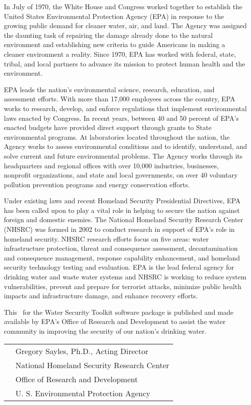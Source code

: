 In July of 1970, the White House and Congress worked together to establish 
the United States Environmental Protection Agency (EPA) in response to the 
growing public demand for cleaner water, air, and land. The Agency was assigned 
the daunting task of repairing the damage already done to the natural 
environment and establishing new criteria to guide Americans in making a cleaner 
environment a reality. Since 1970, EPA has worked with federal, state, tribal, 
and local partners to advance its mission to protect human health and the 
environment.

EPA leads the nation's environmental science, research, education, and assessment 
efforts. With more than 17,000 employees across the country, EPA works to 
research, develop, and enforce regulations that implement environmental laws 
enacted by Congress. In recent years, between 40 and 50 percent of EPA's 
enacted budgets have provided direct support through grants to State 
environmental programs. At laboratories located throughout the nation, the 
Agency works to assess environmental conditions and to identify, understand, and 
solve current and future environmental problems. The Agency works through its 
headquarters and regional offices with over 10,000 industries, businesses, 
nonprofit organizations, and state and local governments, on over 40 
voluntary pollution prevention programs and energy conservation efforts. 

Under existing laws and recent Homeland Security Presidential Directives, EPA 
has been called upon to play a vital role in helping to secure the nation 
against foreign and domestic enemies. The National Homeland Security Research 
Center (NHSRC) was formed in 2002 to conduct research in support of EPA's role 
in homeland security. NHSRC research efforts focus on five areas: water 
infrastructure protection, threat and consequence assessment, decontamination 
and consequence management, response capability enhancement, and homeland 
security technology testing and evaluation. EPA is the lead federal agency 
for drinking water and waste water systems and NHSRC is working to reduce 
system vulnerabilities, prevent and prepare for terrorist attacks, minimize 
public health impacts and infrastructure damage, and enhance recovery efforts. 

This \docTitle\ for the Water Security Toolkit software package is published 
and made available by EPA's Office of Research and Development to assist the 
water community in improving the security of our nation's drinking water.

\vspace*{\baselineskip}
\vspace*{\baselineskip}

\begin{tabular}{ll}
 & Gregory Sayles, Ph.D., Acting Director \\

& National Homeland Security Research Center \\
& Office of Research and Development \\
& U. S. Environmental Protection Agency
\end{tabular}

